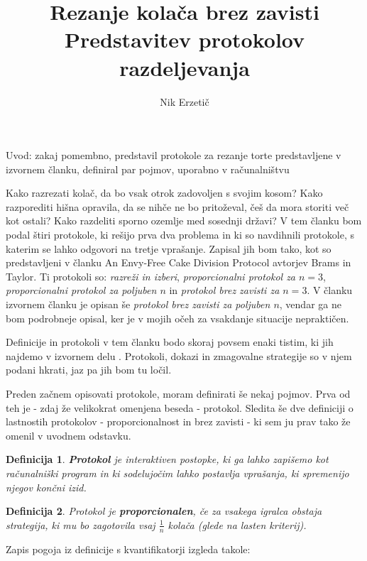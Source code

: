 \documentclass[a4paper, 12pt]{article}
\title{
	\textbf{Rezanje kolača brez zavisti} \\
	\large Predstavitev protokolov razdeljevanja 
}
\author{Nik Erzetič}
\newtheorem{definicija}{Definicija}
\begin{document}
	
	\maketitle
	
	Uvod: zakaj pomembno, predstavil protokole za rezanje torte predstavljene v izvornem članku, definiral par pojmov, uporabno v računalništvu
	
	Kako razrezati kolač, da bo vsak otrok zadovoljen s svojim kosom? Kako razporediti hišna opravila, da se nihče ne bo pritoževal, češ da mora storiti več kot ostali? Kako razdeliti sporno ozemlje med sosednji državi? V tem članku bom podal štiri protokole, ki rešijo prva dva problema in ki so navdihnili protokole, s katerim se lahko odgovori na tretje vprašanje. Zapisal jih bom tako, kot so predstavljeni v članku An Envy-Free Cake Division Protocol \cite{brams-taylor} avtorjev Brams in Taylor. Ti protokoli so: \textit{razreži in izberi}, \textit{proporcionalni protokol za $n = 3$}, \textit{proporcionalni protokol za poljuben $n$} in \textit{protokol brez zavisti za $n = 3$}. V članku izvornem članku je opisan še \textit{protokol brez zavisti za poljuben $n$}, vendar ga ne bom podrobneje opisal, ker je v mojih očeh za vsakdanje situacije nepraktičen.
	
	Definicije in protokoli v tem članku bodo skoraj povsem enaki tistim, ki jih najdemo v izvornem delu \cite{brams-taylor}. Protokoli, dokazi in zmagovalne strategije so v njem podani hkrati, jaz pa jih bom tu ločil.
	
	Preden začnem opisovati protokole, moram definirati še nekaj pojmov. Prva od teh je - zdaj že velikokrat omenjena beseda - protokol. Sledita še dve definiciji o lastnostih protokolov - proporcionalnost in brez zavisti - ki sem ju prav tako že omenil v uvodnem odstavku.

	\begin{definicija}
		\textbf{Protokol} je interaktiven postopke, ki ga lahko zapišemo kot računalniški program in ki sodelujočim lahko postavlja vprašanja, ki spremenijo njegov končni izid.
	\end{definicija}

	\begin{definicija}
		Protokol je \textbf{proporcionalen}, če za vsakega igralca obstaja strategija, ki mu bo zagotovila vsaj $\frac{1}{n}$ kolača (glede na lasten kriterij).
	\end{definicija}

	Zapis pogoja iz definicije s kvantifikatorji izgleda takole:
	
\end{document}
